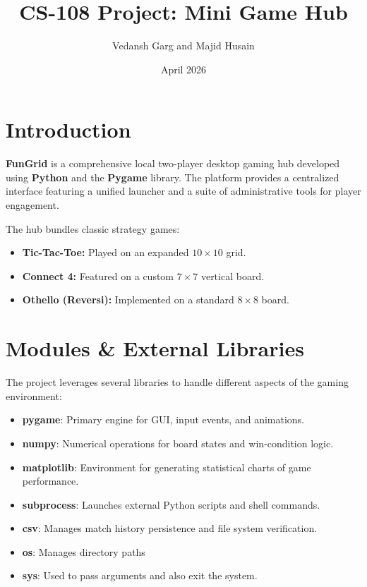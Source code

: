 \documentclass[12pt]{article}
\title{CS-108 Project: Mini Game Hub}
\author{Vedansh Garg and Majid Husain}
\date{April 2026}
\begin{document}
\maketitle

\tableofcontents
\newpage

\section{Introduction}
\textbf{FunGrid} is a comprehensive local two-player desktop gaming hub developed using \textbf{Python} and the \textbf{Pygame} library. The platform provides a centralized interface featuring a unified launcher and a suite of administrative tools for player engagement.

The hub bundles classic strategy games:
\begin{itemize}[label=\textbullet]
    \item \textbf{Tic-Tac-Toe:} Played on an expanded $10 \times 10$ grid.
    \item \textbf{Connect 4:} Featured on a custom $7 \times 7$ vertical board.
    \item \textbf{Othello (Reversi):} Implemented on a standard $8 \times 8$ board.
\end{itemize}

\section{Modules \& External Libraries}
The project leverages several libraries to handle different aspects of the gaming environment:
\begin{itemize}
    \item \textbf{pygame}: Primary engine for GUI, input events, and animations.
    \item \textbf{numpy}: Numerical operations for board states and win-condition logic.
    \item \textbf{matplotlib}: Environment for generating statistical charts of game performance.
    \item \textbf{subprocess}: Launches external Python scripts and shell commands.
    \item \textbf{csv}: Manages match history persistence and file system verification.
    \item \textbf{os}: Manages directory paths
    \item \textbf{sys}: Used to pass arguments and also exit the system.
\end{itemize}
\end{document}
